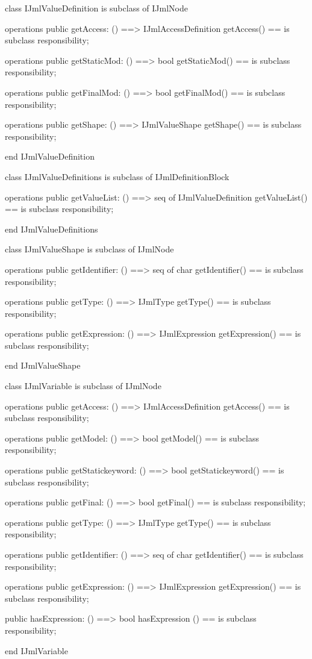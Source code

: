 \begin{vdm_al}
class IJmlValueDefinition
 is subclass of IJmlNode

operations
  public getAccess: () ==> IJmlAccessDefinition
  getAccess() == is subclass responsibility;

operations
  public getStaticMod: () ==> bool
  getStaticMod() == is subclass responsibility;

operations
  public getFinalMod: () ==> bool
  getFinalMod() == is subclass responsibility;

operations
  public getShape: () ==> IJmlValueShape
  getShape() == is subclass responsibility;

end IJmlValueDefinition
\end{vdm_al}

\begin{vdm_al}
class IJmlValueDefinitions
 is subclass of IJmlDefinitionBlock

operations
  public getValueList: () ==> seq of IJmlValueDefinition
  getValueList() == is subclass responsibility;

end IJmlValueDefinitions
\end{vdm_al}

\begin{vdm_al}
class IJmlValueShape
 is subclass of IJmlNode

operations
  public getIdentifier: () ==> seq of char
  getIdentifier() == is subclass responsibility;

operations
  public getType: () ==> IJmlType
  getType() == is subclass responsibility;

operations
  public getExpression: () ==> IJmlExpression
  getExpression() == is subclass responsibility;

end IJmlValueShape
\end{vdm_al}

\begin{vdm_al}
class IJmlVariable
 is subclass of IJmlNode

operations
  public getAccess: () ==> IJmlAccessDefinition
  getAccess() == is subclass responsibility;

operations
  public getModel: () ==> bool
  getModel() == is subclass responsibility;

operations
  public getStatickeyword: () ==> bool
  getStatickeyword() == is subclass responsibility;

operations
  public getFinal: () ==> bool
  getFinal() == is subclass responsibility;

operations
  public getType: () ==> IJmlType
  getType() == is subclass responsibility;

operations
  public getIdentifier: () ==> seq of char
  getIdentifier() == is subclass responsibility;

operations
  public getExpression: () ==> IJmlExpression
  getExpression() == is subclass responsibility;

  public hasExpression: () ==> bool
  hasExpression () == is subclass responsibility;

end IJmlVariable
\end{vdm_al}

